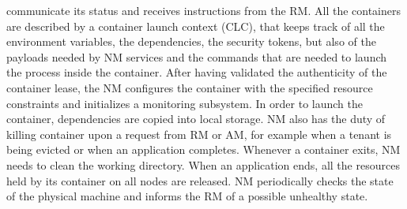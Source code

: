 communicate its status and receives instructions from the RM. All
the containers are described by a container launch context (CLC), that
keeps track of all the environment variables, the dependencies, the security
tokens, but also of the payloads needed by NM services and the
commands that are needed to launch the process inside the container.
After having validated the authenticity of the container lease, the NM
configures the container with the specified resource constraints and
initializes a monitoring subsystem. In order to launch the container,
dependencies are copied into local storage. NM also has the duty of
killing container upon a request from RM or AM, for example when a
tenant is being evicted or when an application completes. Whenever
a container exits, NM needs to clean the working directory. When an
application ends, all the resources held by its container on all nodes
are released. NM periodically checks the state of the physical machine
and informs the RM of a possible unhealthy state.
